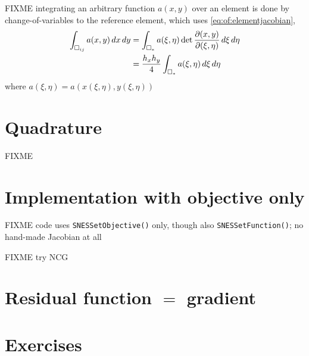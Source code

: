 FIXME integrating an arbitrary function $a(x,y)$ over an element is done by change-of-variables to the reference element, which uses \eqref{eq:of:elementjacobian},
\begin{align}
\int_{\square_{ij}} a(x,y)\,dx\,dy &= \int_{\square_\ast} a(\xi,\eta) \det\frac{\partial(x,y)}{\partial(\xi,\eta)}\,d\xi\,d\eta  \label{eq:of:changeofvars} \\
&= \frac{h_x h_y}{4} \int_{\square_\ast} a(\xi,\eta) \,d\xi\,d\eta \notag
\end{align}
where $a(\xi,\eta)=a(x(\xi,\eta),y(\xi,\eta))$


\section{Quadrature}

FIXME

\section{Implementation with objective only}

FIXME code uses \texttt{SNESSetObjective()} only, though also \texttt{SNESSetFunction()}; no hand-made Jacobian at all

FIXME try NCG






\section{Residual function $=$ gradient}



\section{Exercises}


